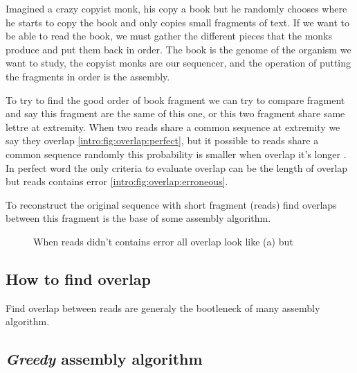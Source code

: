 \documentclass[main.tex]{subfiles}
\begin{document}
Imagined a crazy copyist monk, his copy a book but he randomly chooses where he starts to copy the book and only copies small fragments of text.
If we want to be able to read the book, we must gather the different pieces that the monks produce and put them back in order.
The book is the genome of the organism we want to study, the copyist monks are our sequencer, and the operation of putting the fragments in order is the assembly.

To try to find the good order of book fragment we can try to compare fragment and say this fragment are the same of this one, or this two fragment share same lettre at extremity. When two reads share a common sequence at extremity we say they overlap \ref{intro:fig:overlap:perfect}, but it possible to reads share a common sequence randomly this probability is smaller when overlap it's longer %
. In perfect word the only criteria to evaluate overlap can be the length of overlap but reads contains error \ref{intro:fig:overlap:erroneous}.

To reconstruct the original sequence with short fragment (reads) find overlaps between this fragment is the base of some assembly algorithm.

\begin{figure}[ht]
    \centering
    \caption{When reads didn't contains error all overlap look like (a) but}
    \label{intro:fig:overlap}
\end{figure}

\subsection{How to find overlap}

Find overlap between reads are generaly the bootleneck of many assembly algorithm.

\subsection{\textit{Greedy} assembly algorithm}

\end{document}
